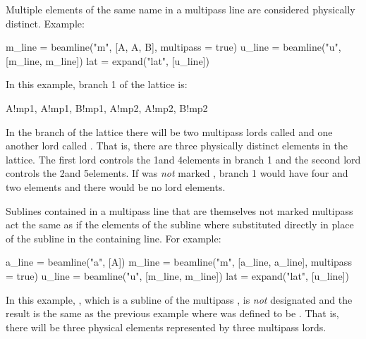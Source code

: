 Multiple elements of the same name in a multipass line are considered 
physically distinct. Example:
\begin{example}
  m_line = beamline("m", [A, A, B], multipass = true)
  u_line = beamline("u", [m_line, m_line])
  lat = expand("lat", [u_line])
\end{example}
In this example, branch 1 of the lattice is:
\begin{example}
  A!mp1, A!mp1, B!mp1, A!mp2, A!mp2, B!mp2
\end{example}
In the  branch of the lattice there will be two multipass lords called  and 
one another lord called . 
That is, there are three physically distinct elements in the lattice. The first
 lord controls the 1\St and 4\Th elements in branch 1 and the second
 lord controls the 2\Nd and 5\Th elements. If  was {\em not} marked ,
branch 1 would have four  and two  elements and there would be
no lord elements.

Sublines contained in a multipass line that are themselves not marked multipass act the same as if
the elements of the subline where substituted directly in place of the subline in the containing
line. For example:
\begin{example}
  a_line = beamline("a", [A])
  m_line = beamline("m", [a_line, a_line], multipass = true)
  u_line = beamline("u", [m_line, m_line])
  lat = expand("lat", [u_line])
\end{example}
In this example, , which is a subline of the multipass , is {\em not}
designated  and the result is the same as the previous example where  was
defined to be . That is, there will be three physical elements represented by three
multipass lords.

